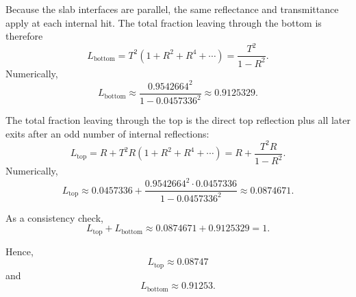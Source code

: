 \documentclass[a4paper,11pt]{article}
\begin{document}
Because the slab interfaces are parallel, the same reflectance and transmittance apply at each internal hit. The total fraction leaving through the bottom is therefore
\[
L_{\text{bottom}} = T^2 \left(1 + R^2 + R^4 + \cdots\right)
= \frac{T^2}{1-R^2}.
\]
Numerically,
\[
L_{\text{bottom}} \approx \frac{0.9542664^2}{1-0.0457336^2}
\approx 0.9125329.
\]

The total fraction leaving through the top is the direct top reflection plus all later exits after an odd number of internal reflections:
\[
L_{\text{top}} = R + T^2R\left(1 + R^2 + R^4 + \cdots\right)
= R + \frac{T^2R}{1-R^2}.
\]
Numerically,
\[
L_{\text{top}} \approx 0.0457336 + \frac{0.9542664^2 \cdot 0.0457336}{1-0.0457336^2}
\approx 0.0874671.
\]

As a consistency check,
\[
L_{\text{top}} + L_{\text{bottom}} \approx 0.0874671 + 0.9125329 = 1.
\]

Hence,
\[
\boxed{L_{\text{top}} \approx 0.08747}
\]
and
\[
\boxed{L_{\text{bottom}} \approx 0.91253.}
\]
\end{document}

